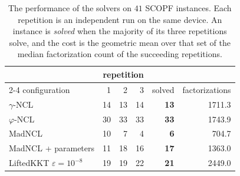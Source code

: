 \begin{table}[hbp]\centering
\caption{The performance of the solvers on $41$ SCOPF instances. Each repetition is an independent run on the same device. An instance is \emph{solved} when the majority of its three repetitions solve, and the cost is the geometric mean over that set of the median factorization count of the succeeding repetitions.}
\label{tab:gpu-scopf}
\begin{tabular}{lrrrrr}\toprule
 & \multicolumn{3}{c}{repetition} & & \\
\cmidrule(lr){2-4}
configuration & 1 & 2 & 3 & solved & factorizations \\\midrule
$\gamma$-NCL & 14 & 13 & 14 & \textbf{13} & 1711.3 \\
$\varphi$-NCL & 30 & 33 & 33 & \textbf{33} & 1743.9 \\
MadNCL & 10 & 7 & 4 & \textbf{6} & 704.7 \\
MadNCL + parameters & 11 & 18 & 16 & \textbf{17} & 1363.0 \\
LiftedKKT $\varepsilon=10^{-8}$ & 19 & 19 & 22 & \textbf{21} & 2449.0 \\
\bottomrule\end{tabular}\end{table}
